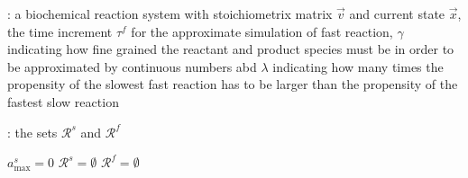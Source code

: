 \begin{algorithm}[H]
\DontPrintSemicolon
{}

\caption{\protect\TitleFunction{}}
\label{algo:two-class-reaction-fixed-point}

\Input: a biochemical reaction system with stoichiometrix matrix $\vec{v}$ and current state $\vec{x}$, the time increment $\tau^f$ for the approximate simulation of fast reaction, $\gamma$ indicating how fine grained the reactant and product species must be in order to be approximated by continuous numbers abd $\lambda$ indicating how many times the propensity of the slowest fast reaction has to be larger than the propensity of the fastest slow reaction\;

\Output: the sets $\mathcal{R}^s$ and $\mathcal{R}^f$\;

$a^s_{\max} = 0$\;
$\mathcal{R}^s = \emptyset$\;
$\mathcal{R}^f = \emptyset$\;


\end{algorithm}
